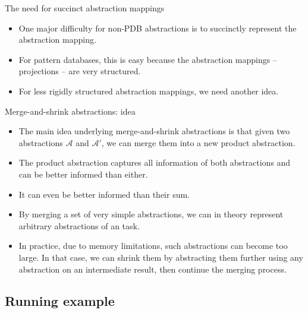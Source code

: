 \documentclass{gkibeamer}
\begin{document}
\begin{frame}{The need for succinct abstraction mappings}
  \begin{itemize}
  \item One major difficulty for non-PDB abstractions is to
    \alert{succinctly represent the abstraction mapping}.
  \item For pattern databases, this is easy because the abstraction
    mappings -- projections -- are very \alert{structured}.
  \item For less rigidly structured abstraction mappings, we need
    another idea.
  \end{itemize}
\end{frame}

\begin{frame}{Merge-and-shrink abstractions: idea}
  \begin{itemize}
  \item The main idea underlying merge-and-shrink abstractions is
    that given two abstractions $\mathcal A$ and $\mathcal A'$, we can
    \alert{merge} them into a new \alert{product abstraction}.
  \item The product abstraction \alert{captures all information} of
    both abstractions and can be \alert{better informed than either}.
  \item It can even be better informed than their \alert{sum}.
  \item By merging a set of very simple abstractions, we can in theory
    represent \alert{arbitrary} abstractions of an {\sasplus} task.
  \item In practice, due to memory limitations, such abstractions can
    become too large. In that case, we can \alert{shrink} them by
    abstracting them further using \alert{any abstraction} on an
    intermediate result, then \alert{continue the merging process}.
  \end{itemize}
\end{frame}

\subsection{Running example}
\end{document}
